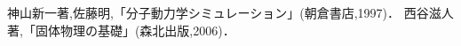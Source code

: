 
\renewcommand{\bibname}{参考文献}




%

\tableofcontents





\begin{thebibliography}{9}
神山新一著,佐藤明,「分子動力学シミュレーション」(朝倉書店,1997)．
西谷滋人著,「固体物理の基礎」(森北出版,2006)．
\end{thebibliography}

